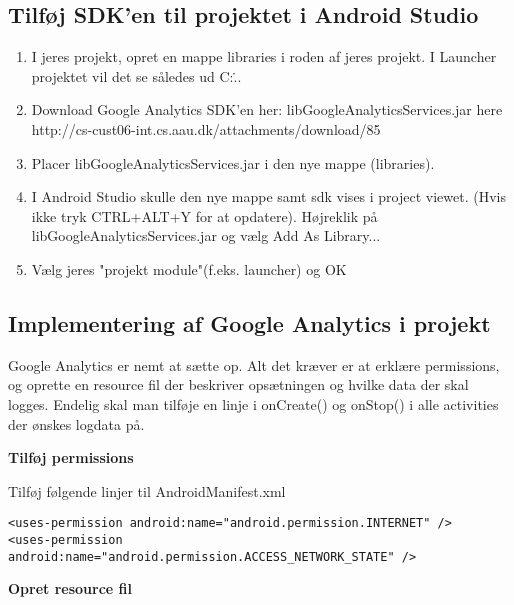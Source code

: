 \subsection{Tilføj SDK'en til projektet i Android Studio}
\begin{enumerate}
	\item I jeres projekt, opret en mappe libraries i roden af jeres projekt.
	I Launcher projektet vil det se således ud C:\...\launcher\libraries
	\item Download Google Analytics SDK'en her: libGoogleAnalyticsServices.jar here http://cs-cust06-int.cs.aau.dk/attachments/download/85
	\item Placer libGoogleAnalyticsServices.jar i den nye mappe (libraries).
	\item I Android Studio skulle den nye mappe samt sdk vises i project viewet. (Hvis ikke tryk CTRL+ALT+Y for at opdatere). Højreklik på libGoogleAnalyticsServices.jar og vælg Add As Library...
	\item Vælg jeres "projekt module"(f.eks. launcher) og OK
\end{enumerate}

\subsection{Implementering af Google Analytics i projekt}
Google Analytics er nemt at sætte op.
Alt det kræver er at erklære permissions, og oprette en resource fil der beskriver opsætningen og hvilke data der skal logges. Endelig skal man tilføje en linje i onCreate() og onStop() i alle activities der ønskes logdata på.

\textbf{Tilføj permissions}

Tilføj følgende linjer til AndroidManifest.xml

\begin{lstlisting}
<uses-permission android:name="android.permission.INTERNET" />
<uses-permission android:name="android.permission.ACCESS_NETWORK_STATE" />
\end{lstlisting}

\textbf{Opret resource fil}

